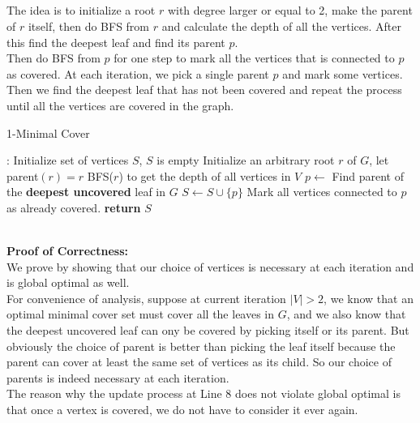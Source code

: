 \documentclass[12pt,letterpaper]{article}
\begin{document}
\subsection{}
The idea is to initialize a root $r$ with degree larger or equal to 2,
make the parent of $r$ itself,
then do BFS from $r$ and calculate the depth of all the vertices.
After this find the deepest leaf and find its parent $p$.\\
Then do BFS from $p$ for one step to mark all the vertices that is connected to $p$ as covered.
At each iteration, we pick a single parent $p$ and mark some vertices.\\
Then we find the deepest leaf that has not been covered and repeat the process
until all the vertices are covered in the graph.\\
\begin{algorithm}
  \caption{1-Minimal Cover}\label{alg:1cover}
  \begin{algorithmic}[1]
  :
  \State Initialize set of vertices $S$, $S$ is empty
  \State Initialize an arbitrary root $r$ of $G$, let parent$(r)=r$ 
  \State BFS($r$) to get the depth of all vertices in $V$
  \State $p\gets$ Find parent of the \textbf{deepest uncovered} leaf in $G$
  \State $S\gets S\cup\{p\}$
  \State Mark all vertices connected to $p$ as already covered.
  \EndWhile
  \State \textbf{return} $S$
  \EndProcedure
  \end{algorithmic}
\end{algorithm}\\
\textbf{Proof of Correctness:}\\
We prove by showing that our choice of vertices is necessary at each iteration 
and is global optimal as well.\\
For convenience of analysis, suppose at current iteration $|V|>2$, 
we know that an optimal minimal cover set must cover all the leaves in $G$,
and we also know that the deepest uncovered leaf can ony be covered
by picking itself or its parent.
But obviously the choice of parent is better than picking the leaf itself
because the parent can cover at least the same set of vertices as its child.
So our choice of parents is indeed necessary at each iteration.\\
The reason why the update process at Line 8
does not violate global optimal is that
once a vertex is covered, 
we do not have to consider it ever again.
\end{document}
